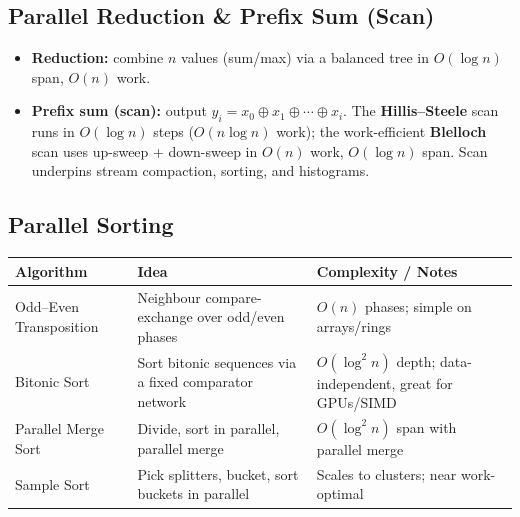 \documentclass[11pt,a4paper]{article}
\begin{document}
\subsection{Parallel Reduction \& Prefix Sum (Scan)}
\begin{itemize}[leftmargin=*, itemsep=2pt]
  \item \textbf{Reduction:} combine $n$ values (sum/max) via a balanced tree in $O(\log n)$ span, $O(n)$ work.
  \item \textbf{Prefix sum (scan):} output $y_i = x_0 \oplus x_1 \oplus \cdots \oplus x_i$. The \textbf{Hillis--Steele} scan runs in $O(\log n)$ steps ($O(n\log n)$ work); the work-efficient \textbf{Blelloch} scan uses up-sweep + down-sweep in $O(n)$ work, $O(\log n)$ span. Scan underpins stream compaction, sorting, and histograms.
\end{itemize}

\begin{center}
\end{center}

\subsection{Parallel Sorting}
\begin{longtable}{@{}p{3.4cm}p{4.4cm}p{5.6cm}@{}}
\toprule
\rowcolor{primary!15}
\textbf{Algorithm} & \textbf{Idea} & \textbf{Complexity / Notes} \\
\midrule
\endhead
Odd--Even Transposition & Neighbour compare-exchange over odd/even phases & $O(n)$ phases; simple on arrays/rings \\
Bitonic Sort & Sort bitonic sequences via a fixed comparator network & $O(\log^2 n)$ depth; data-independent, great for GPUs/SIMD \\
Parallel Merge Sort & Divide, sort in parallel, parallel merge & $O(\log^2 n)$ span with parallel merge \\
Sample Sort & Pick splitters, bucket, sort buckets in parallel & Scales to clusters; near work-optimal \\
\bottomrule
\end{longtable}
\end{document}
